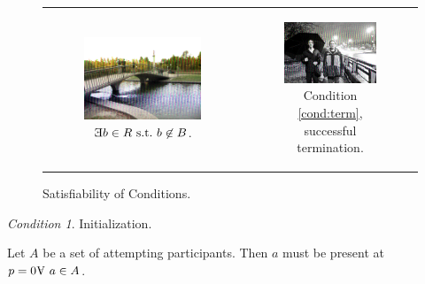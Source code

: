 \documentclass[twocolumn]{article}
\renewcommand\exists{\reflectbox{E}}
\renewcommand\forall{\raisebox{\depth}{\rotatebox{180}{A}}}
\theoremstyle{plain}  %
\theoremstyle{definition}  %
\theoremstyle{remark}  %
\newtheorem{cond}{Condition}
\begin{document}
\begin{figure}[b]
\begin{tabular}{cc}
	\begin{subfigure}[b]{0.45\textwidth}
	\centering
	\includegraphics[width=\textwidth]{mini-koenigs.png}
	\caption{$\exists b \in R~\text{s.t.}~b \not\in B$.}
	\end{subfigure}
	&
	\begin{subfigure}[b]{0.45\textwidth}
	\centering
	\includegraphics[width=\textwidth]{finish.png}
	\caption{Condition \ref{cond:term}, successful termination.}
	\end{subfigure}

	\end{tabular}
	\caption{Satisfiability of Conditions. \cite{alanv}}
	\label{fig:photos}
\end{figure}

\begin{cond}
	\label{cond:init}
Initialization.

Let $A$ be a set of attempting participants.  Then $a$ must be present at $p = 0 \forall~a \in A$.
\end{cond}
\end{document}
